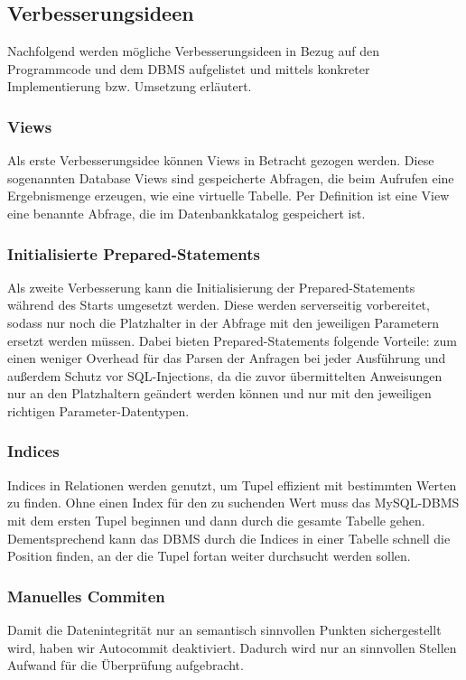 \subsection{Verbesserungsideen}\label{subsec:verbesserungsideen}
Nachfolgend werden mögliche Verbesserungsideen in Bezug auf den Programmcode und dem DBMS aufgelistet und mittels konkreter Implementierung bzw. Umsetzung erläutert.
\subsubsection{Views}
Als erste Verbesserungsidee können Views in Betracht gezogen werden.
Diese sogenannten Database Views sind gespeicherte Abfragen, die beim Aufrufen eine Ergebnismenge erzeugen, wie eine virtuelle Tabelle.
Per Definition ist eine View eine benannte Abfrage, die im Datenbankkatalog gespeichert ist.

\subsubsection{Initialisierte Prepared-Statements}
Als zweite Verbesserung kann die Initialisierung der Prepared-Statements während des Starts umgesetzt werden.
Diese werden serverseitig vorbereitet, sodass nur noch die Platzhalter in der Abfrage mit den jeweiligen Parametern ersetzt werden müssen.
Dabei bieten Prepared-Statements folgende Vorteile: zum einen weniger Overhead für das Parsen der Anfragen bei jeder Ausführung und außerdem Schutz vor SQL-Injections, da die zuvor übermittelten Anweisungen nur an den Platzhaltern geändert werden können und nur mit den jeweiligen richtigen Parameter-Datentypen.
\subsubsection{Indices}
Indices in Relationen werden genutzt, um Tupel effizient mit bestimmten Werten zu finden.
Ohne einen Index für den zu suchenden Wert muss das MySQL-DBMS mit dem ersten Tupel beginnen und dann durch die gesamte Tabelle gehen.
Dementsprechend kann das DBMS durch die Indices in einer Tabelle schnell die Position finden, an der die Tupel fortan weiter durchsucht werden sollen.

\subsubsection{Manuelles Commiten}
Damit die Datenintegrität nur an semantisch sinnvollen Punkten sichergestellt wird, haben wir Autocommit deaktiviert.
Dadurch wird nur an sinnvollen Stellen Aufwand für die Überprüfung aufgebracht.

